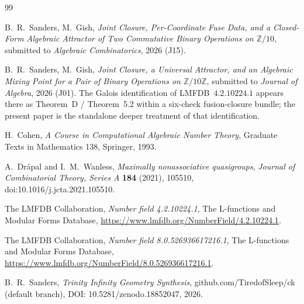 \documentclass[11pt,reqno]{amsart}
\theoremstyle{plain}
\theoremstyle{definition}
\theoremstyle{remark}
\newcommand{\Z}{\mathbb{Z}}
\begin{document}
\begin{thebibliography}{99}

 B.~R.~Sanders, M.~Gish,
\emph{Joint Closure, Per-Coordinate Fuse Data, and a Closed-Form
Algebraic Attractor of Two Commutative Binary Operations on
$\Z/10$}, submitted to \emph{Algebraic Combinatorics}, 2026 (J15).

 B.~R.~Sanders, M.~Gish,
\emph{Joint Closure, a Universal Attractor, and an Algebraic Mixing
Point for a Pair of Binary Operations on $\Z/10\Z$}, submitted to
\emph{Journal of Algebra}, 2026 (J01). The Galois identification of
LMFDB~$4.2.10224.1$ appears there as Theorem~D / Theorem~5.2 within a
six-check fusion-closure bundle; the present paper is the standalone
deeper treatment of that identification.

 H.~Cohen,
\emph{A Course in Computational Algebraic Number Theory},
Graduate Texts in Mathematics 138, Springer, 1993.

 A.~Dr\'apal and I.~M.~Wanless,
\emph{Maximally nonassociative quasigroups},
\textit{Journal of Combinatorial Theory, Series A} \textbf{184} (2021),
105510, doi:10.1016/j.jcta.2021.105510.

 The {LMFDB} Collaboration,
\emph{Number field 4.2.10224.1},
The L-functions and Modular Forms Database,
\url{https://www.lmfdb.org/NumberField/4.2.10224.1}.

 The {LMFDB} Collaboration,
\emph{Number field 8.0.526936617216.1},
The L-functions and Modular Forms Database,
\url{https://www.lmfdb.org/NumberField/8.0.526936617216.1}.

 B.~R.~Sanders,
\emph{Trinity Infinity Geometry Synthesis},
github.com/TiredofSleep/ck (default branch),
DOI: 10.5281/zenodo.18852047, 2026.

\end{thebibliography}
\end{document}
